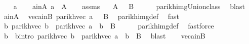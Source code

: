 \begin{isabellebody}
%
\isadelimproof
%
\endisadelimproof
%
\isatagproof
{}\isamarkupfalse%
\isanewline
\ \ \isamarkupfalse%
\ a\isanewline
\ \ \isamarkupfalse%
\ a{\isacharunderscore}{\kern0pt}in{\isacharunderscore}{\kern0pt}A{\isacharcolon}{\kern0pt}\ {\isachardoublequoteopen}a\ {\isasymin}\ A{\isachardoublequoteclose}\isanewline
\ \ \isamarkupfalse%
\ assms\ \isamarkupfalse%
\ {\isachardoublequoteopen}{\isasymPsi}\ A\ {\isasymsubseteq}\ {\isasymPsi}\ {\isacharquery}{\kern0pt}B{\isacharprime}{\kern0pt}{\isachardoublequoteclose}\isanewline
\ \ \ \ \isamarkupfalse%
\ parikh{\isacharunderscore}{\kern0pt}img{\isacharunderscore}{\kern0pt}Union{\isacharunderscore}{\kern0pt}class\ \isamarkupfalse%
\ blast\isanewline
\ \ \isamarkupfalse%
\ a{\isacharunderscore}{\kern0pt}in{\isacharunderscore}{\kern0pt}A\ \isamarkupfalse%
\ vec{\isacharunderscore}{\kern0pt}a{\isacharunderscore}{\kern0pt}in{\isacharunderscore}{\kern0pt}B{\isacharprime}{\kern0pt}{\isacharcolon}{\kern0pt}\ {\isachardoublequoteopen}parikh{\isacharunderscore}{\kern0pt}vec\ a\ {\isasymin}\ {\isasymPsi}\ {\isacharquery}{\kern0pt}B{\isacharprime}{\kern0pt}{\isachardoublequoteclose}\ \isamarkupfalse%
\ parikh{\isacharunderscore}{\kern0pt}img{\isacharunderscore}{\kern0pt}def\ \isamarkupfalse%
\ fast\isanewline
\ \ \isamarkupfalse%
\ \isamarkupfalse%
\ {\isachardoublequoteopen}{\isasymexists}b{\isachardot}{\kern0pt}\ parikh{\isacharunderscore}{\kern0pt}vec\ b\ {\isacharequal}{\kern0pt}\ parikh{\isacharunderscore}{\kern0pt}vec\ a\ {\isasymand}\ b\ {\isasymin}\ {\isacharquery}{\kern0pt}B{\isacharprime}{\kern0pt}{\isachardoublequoteclose}\isanewline
\ \ \ \ \isamarkupfalse%
\ parikh{\isacharunderscore}{\kern0pt}img{\isacharunderscore}{\kern0pt}def\ \isamarkupfalse%
\ fastforce\isanewline
\ \ \isamarkupfalse%
\ \isamarkupfalse%
\ b\ \ b{\isacharunderscore}{\kern0pt}intro{\isacharcolon}{\kern0pt}\ {\isachardoublequoteopen}parikh{\isacharunderscore}{\kern0pt}vec\ b\ {\isacharequal}{\kern0pt}\ parikh{\isacharunderscore}{\kern0pt}vec\ a\ {\isasymand}\ b\ {\isasymin}\ {\isacharquery}{\kern0pt}B{\isacharprime}{\kern0pt}{\isachardoublequoteclose}\ \isamarkupfalse%
\ blast\isanewline
\ \ \isamarkupfalse%
\ vec{\isacharunderscore}{\kern0pt}a{\isacharunderscore}{\kern0pt}in{\isacharunderscore}{\kern0pt}B{\isacharprime}{\kern0pt}\ \isamarkupfalse%

\end{isabellebody}
